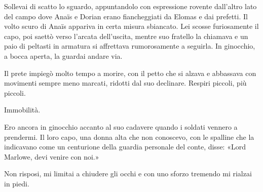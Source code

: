 Sollevai di scatto lo sguardo, appuntandolo con espressione rovente
dall'altro lato del campo dove Anaïs e Dorian erano fiancheggiati da
Elomas e dai prefetti. Il volto scuro di Anaïs appariva in certa misura
sbiancato. Lei scosse furiosamente il capo, poi saettò verso l'arcata
dell'uscita, mentre suo fratello la chiamava e un paio di peltasti in
armatura si affrettava rumorosamente a seguirla. In ginocchio, a bocca
aperta, la guardai andare via.

Il prete impiegò molto tempo a morire, con il petto che si alzava e
abbassava con movimenti sempre meno marcati, ridotti dal suo declinare.
Respiri piccoli, più piccoli.

Immobilità.

Ero ancora in ginocchio accanto al suo cadavere quando i soldati vennero
a prendermi. Il loro capo, una donna alta che non conoscevo, con le
spalline che la indicavano come un centurione della guardia personale
del conte, disse: «Lord Marlowe, devi venire con noi.»

Non risposi, mi limitai a chiudere gli occhi e con uno sforzo tremendo
mi rialzai in piedi.

